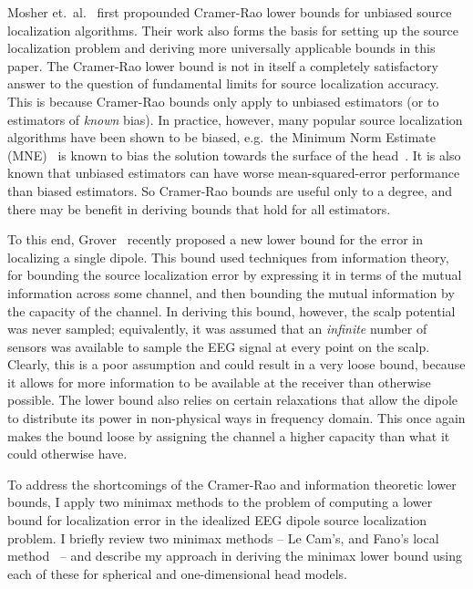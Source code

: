 \documentclass[conference]{IEEEtran}
\begin{document}
Mosher et.\ al.~\cite{Mosher1993Error} first propounded Cramer-Rao lower bounds
for unbiased source localization algorithms. Their work also forms the basis
for setting up the source localization problem and deriving more universally
applicable bounds in this paper. The Cramer-Rao lower bound is not in itself a
completely satisfactory answer to the question of fundamental limits for source
localization accuracy. This is because Cramer-Rao bounds only apply to unbiased
estimators (or to estimators of \emph{known} bias). In practice, however, many
popular source localization algorithms have been shown to be biased, e.g.\
the Minimum Norm Estimate (MNE)~\cite{Hamalainen1994Interpreting} is known to
bias the solution towards the surface of the head~\cite{Lin2006Assessing}. It
is also known that unbiased estimators can have worse mean-squared-error
performance than biased estimators. So Cramer-Rao bounds are useful only to a
degree, and there may be benefit in deriving bounds that hold for all
estimators.

To this end, Grover~\cite{Grover2016Fundamental} recently proposed a new lower
bound for the error in localizing a single dipole. This bound used techniques
from information theory, for bounding the source localization error by
expressing it in terms of the mutual information across some channel, and then
bounding the mutual information by the capacity of the channel. In deriving
this bound, however, the scalp potential was never sampled; equivalently, it
was assumed that an \emph{infinite} number of sensors was available to sample
the EEG signal at every point on the scalp. Clearly, this is a poor assumption
and could result in a very loose bound, because it allows for more information
to be available at the receiver than otherwise possible. The lower bound also
relies on certain relaxations that allow the dipole to distribute its power in
non-physical ways in frequency domain. This once again makes the bound loose by
assigning the channel a higher capacity than what it could otherwise have.

To address the shortcomings of the Cramer-Rao and information theoretic lower
bounds, I apply two minimax methods to the problem of computing a lower bound
for localization error in the idealized EEG dipole source localization problem.
I briefly review two minimax methods -- Le Cam's, and Fano's local
method~\cite{Duchi2015Information} -- and describe my approach in deriving the
minimax lower bound using each of these for spherical and one-dimensional head
models.
\end{document}

